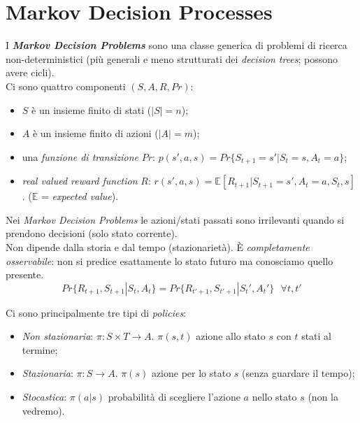 \documentclass[a4paper, notitlepage, 9pt]{extreport}
\begin{document}
\section*{Markov Decision Processes}
I \textit{\textbf{Markov Decision Problems}} sono una classe generica di problemi di ricerca non-deterministici (più generali e meno strutturati dei \textit{decision trees}; possono avere cicli).\\
Ci sono quattro componenti $(S, A, R, Pr)$:
\begin{itemize}
	\item $S$ è un insieme finito di stati ($|S| = n$);
	\item $A$ è un insieme finito di azioni ($|A| = m$);
	\item una \textit{funzione di transizione} $Pr$: $p(s', a, s) = Pr\{ S_{t+1} = s' | S_t = s, A_t = a \}$;
	\item \textit{real valued reward function} $R$: $r(s', a, s) = \mathbb{E}[R_{t+1} | S_{t+1} = s', A_t = a, S_t, s]$. ($\mathbb{E}$ = \textit{expected value}).
\end{itemize}
Nei \textit{Markov Decision Problems} le azioni/stati passati sono irrilevanti quando si prendono decisioni (solo stato corrente).\\
Non dipende dalla storia e dal tempo (stazionarietà). È \textit{completamente osservabile}: non si predice esattamente lo stato futuro ma conosciamo quello presente.
$$Pr\{R_{t+1}, S_{t+1} | S_t, A_t\} = Pr\{R_{t'+1}, S_{t'+1} | S_t', A_t'\} ~~~\forall t, t'$$

\noindent
Ci sono principalmente tre tipi di \textit{policies}:
\begin{itemize}
	\item \textit{Non stazionaria}: $\pi: S \times T \rightarrow A$. $\pi (s, t)$ azione allo stato $s$ con $t$ stati al termine;
	\item \textit{Stazionaria}: $\pi: S \rightarrow A$. $\pi (s)$ azione per lo stato $s$ (senza guardare il tempo);
	\item \textit{Stocastica}: $\pi(a | s)$ probabilità di scegliere l'azione $a$ nello stato $s$ (non la vedremo).
\end{itemize}
\end{document}
